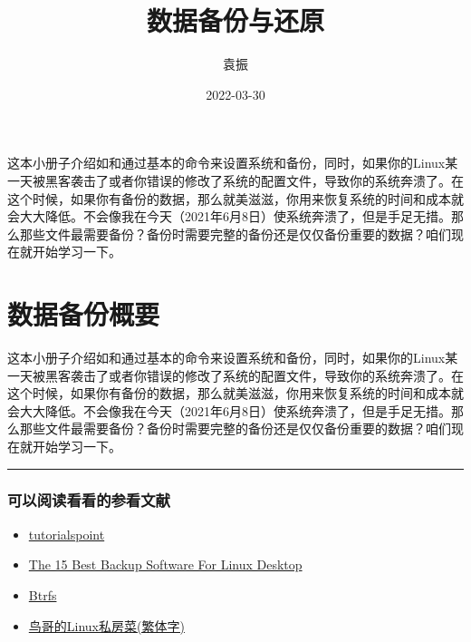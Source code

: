 \documentclass[
]{book}
\title{数据备份与还原}
\author{袁振}
\date{2022-03-30}
\providecommand{\tightlist}{%
  \setlength{\itemsep}{0pt}\setlength{\parskip}{0pt}}
\begin{document}
\maketitle

{
\setcounter{tocdepth}{1}
\tableofcontents
}
这本小册子介绍如和通过基本的命令来设置系统和备份，同时，如果你的Linux某一天被黑客袭击了或者你错误的修改了系统的配置文件，导致你的系统奔溃了。在这个时候，如果你有备份的数据，那么就美滋滋，你用来恢复系统的时间和成本就会大大降低。不会像我在今天（2021年6月8日）使系统奔溃了，但是手足无措。那么那些文件最需要备份？备份时需要完整的备份还是仅仅备份重要的数据？咱们现在就开始学习一下。

\hypertarget{intro}{%
\chapter{数据备份概要}\label{intro}}

这本小册子介绍如和通过基本的命令来设置系统和备份，同时，如果你的Linux某一天被黑客袭击了或者你错误的修改了系统的配置文件，导致你的系统奔溃了。在这个时候，如果你有备份的数据，那么就美滋滋，你用来恢复系统的时间和成本就会大大降低。不会像我在今天（2021年6月8日）使系统奔溃了，但是手足无措。那么那些文件最需要备份？备份时需要完整的备份还是仅仅备份重要的数据？咱们现在就开始学习一下。

\begin{center}\rule{0.5\linewidth}{0.5pt}\end{center}

\hypertarget{ux53efux4ee5ux9605ux8bfbux770bux770bux7684ux53c2ux770bux6587ux732e}{%
\subsection{可以阅读看看的参看文献}\label{ux53efux4ee5ux9605ux8bfbux770bux770bux7684ux53c2ux770bux6587ux732e}}

\begin{itemize}
\tightlist
\item
  \href{https://www.tutorialspoint.com/linux_admin/linux_admin_backup_and_recovery.htm}{tutorialspoint}
\item
  \href{https://www.ubuntupit.com/best-backup-software-for-linux/}{The 15 Best Backup Software For Linux Desktop}
\item
  \href{https://wiki.archlinux.org/title/Btrfs}{Btrfs}
\item
  \href{http://linux.vbird.org/linux_basic/0610hardware.php}{鸟哥的Linux私房菜(繁体字)}
\end{itemize}
\end{document}
